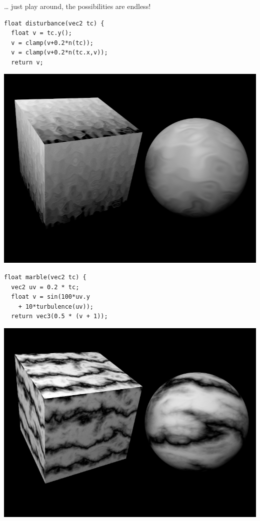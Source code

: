 \documentclass[utf8,stillsansserifmath,fleqn,t]{beamer}
\begin{document}
\begin{frame}[fragile,label=noise-4]
\frametitle{\insertsection}
\vspace*{.5ex}
\ldots{} just play around, the possibilities are endless!\\
\begin{minipage}{.48\textwidth}
\begin{lstlisting}
float disturbance(vec2 tc) {
  float v = tc.y();
  v = clamp(v+0.2*n(tc));
  v = clamp(v+0.2*n(tc.x,v));
  return v;
\end{lstlisting}
\vspace*{-.5ex}
\centerline{\includegraphics[width=.9\textwidth]{./fig/noise-example-gradient-disturbance.png}}
\end{minipage}\hfill
\begin{minipage}{.48\textwidth}
\begin{lstlisting}
float marble(vec2 tc) {
  vec2 uv = 0.2 * tc;
  float v = sin(100*uv.y
    + 10*turbulence(uv));
  return vec3(0.5 * (v + 1));
\end{lstlisting}
\vspace*{-.5ex}
\centerline{\includegraphics[width=.9\textwidth]{./fig/noise-example-gradient-marble.png}}
\end{minipage}
\end{frame}
\end{document}
